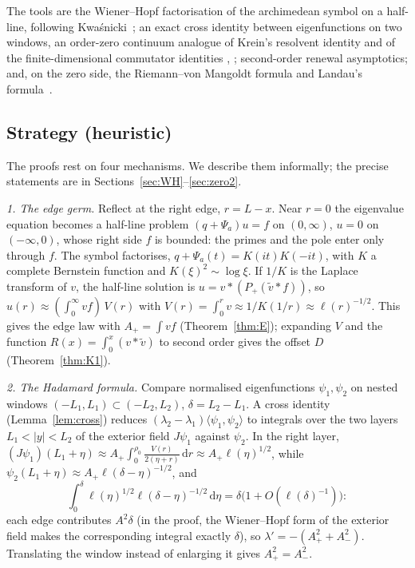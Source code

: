 \documentclass[11pt]{amsart}
\newcommand{\dd}{\,\mathrm{d}}
\theoremstyle{definition}
\theoremstyle{remark}
\numberwithin{equation}{section}
\begin{document}
The tools are the Wiener--Hopf factorisation of the archimedean symbol on a half-line, following Kwa\'snicki~\cite{Kw11}; an exact cross identity between eigenfunctions on two windows, an order-zero continuum analogue of Krein's resolvent identity \cite[Lemma~2.3]{Den06} and of the finite-dimensional commutator identities \cite[Lemma~5.2(ii)]{CCM25}, \cite[Lemma~5.1(ii)]{CvS}; second-order renewal asymptotics; and, on the zero side, the Riemann--von Mangoldt formula and Landau's formula~\cite{Lan12}.

\subsection{Strategy (heuristic)}\label{sec:strategy}
The proofs rest on four mechanisms. We describe them informally; the precise statements are in Sections~\ref{sec:WH}--\ref{sec:zero2}.

\emph{1. The edge germ.} Reflect at the right edge, $r=L-x$. Near $r=0$ the eigenvalue equation becomes a half-line problem $(q+\Psi_a)u=f$ on $(0,\infty)$, $u=0$ on $(-\infty,0)$, whose right side $f$ is bounded: the primes and the pole enter only through $f$. The symbol factorises, $q+\Psi_a(t)=K(it)K(-it)$, with $K$ a complete Bernstein function and $K(\xi)^2\sim\log\xi$. If $1/K$ is the Laplace transform of $v$, the half-line solution is $u=v*(P_+(\tilde v*f))$, so $u(r)\approx(\int_0^\infty vf)\,V(r)$ with $V(r)=\int_0^rv\approx1/K(1/r)\approx\ell(r)^{-1/2}$. This gives the edge law with $A_+=\int vf$ (Theorem~\ref{thm:E}); expanding $V$ and the function $R(x)=\int_0^x(v*\tilde v)$ to second order gives the offset $D$ (Theorem~\ref{thm:K1}).

\emph{2. The Hadamard formula.} Compare normalised eigenfunctions $\psi_1,\psi_2$ on nested windows $(-L_1,L_1)\subset(-L_2,L_2)$, $\delta=L_2-L_1$. A cross identity (Lemma~\ref{lem:cross}) reduces $(\lambda_2-\lambda_1)\langle\psi_1,\psi_2\rangle$ to integrals over the two layers $L_1<|y|<L_2$ of the exterior field $J\psi_1$ against $\psi_2$. In the right layer, $(J\psi_1)(L_1+\eta)\approx A_+\int_0^{\rho_0}\frac{V(r)}{2(\eta+r)}\dd r\approx A_+\ell(\eta)^{1/2}$, while $\psi_2(L_1+\eta)\approx A_+\ell(\delta-\eta)^{-1/2}$, and
\[
\int_0^\delta\ell(\eta)^{1/2}\ell(\delta-\eta)^{-1/2}\dd\eta=\delta\bigl(1+O(\ell(\delta)^{-1})\bigr):
\]
each edge contributes $A^2\delta$ (in the proof, the Wiener--Hopf form of the exterior field makes the corresponding integral exactly $\delta$), so $\lambda'=-(A_+^2+A_-^2)$. Translating the window instead of enlarging it gives $A_+^2=A_-^2$.
\end{document}
